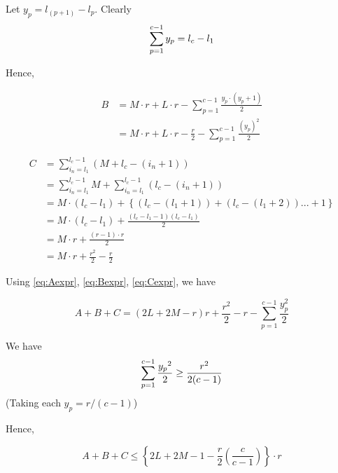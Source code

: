 \documentclass[10pt,letterpaper]{article}
\begin{document}
Let $ y_p = l_{(p+1)} - l_p $. Clearly 
\begin{equation*}
\sum_{p=1}^{c-1} y_p = l_c - l_1 \\
\end{equation*}	

Hence,

\begin{align}
 B & = M \cdot r + L \cdot r - \sum_{p=1}^{c-1} \frac{y_p \cdot (y_p + 1)}{2} \nonumber \\
	  & = M \cdot r + L \cdot r - \frac{r}{2} - \sum_{p=1}^{c-1} \frac{(y_p)^2}{2} \label{eq:Bexpr}
\end{align}

\begin{align}
	C & = \sum_{i_n = l_1}^{l_c - 1} (M + l_c - (i_n + 1)) \nonumber\\
	  & = \sum_{i_n = l_1}^{l_c - 1} M + \sum_{i_n = l_1}^{l_c - 1} \left(l_c - (i_n + 1) \right) \nonumber\\
	  & = M\cdot(l_c - l_1) + \left\{ (l_c - (l_1 + 1)) + (l_c - (l_1 + 2))... + 1 \right\} \nonumber \\
	& = M\cdot(l_c - l_1) + \frac{(l_c - l_1 - 1)(l_c - l_1)}{2} \nonumber \\
	& = M \cdot r + \frac{(r-1)\cdot r}{2} \nonumber \\
	& = M \cdot r + \frac{r^2}{2} - \frac{r}{2} \label{eq:Cexpr}
\end{align}

Using \eqref{eq:Aexpr}, \eqref{eq:Bexpr}, \eqref{eq:Cexpr}, we have

\begin {equation} \label{eq:sum_ABC}
A + B + C = (2L + 2M - r)r + \frac{r^2}{2} - r -\sum_{p=1}^{c-1}\frac{y_{p}^2}{2}
\end{equation}

We have
\begin{equation*}
	\sum_{p = 1}^{c-1} \frac{{y_p}^2}{2} \geq \frac{r^2}{2(c-1)} \\
\end{equation*}
(Taking each $y_p = r/(c-1)$)


Hence,

\begin{equation*}
	A + B + C \leq \left\{2L + 2M - 1 - \frac{r}{2}\left(\frac{c}{c - 1}\right)\right\}\cdot r
\end{equation*}
\end{document}
